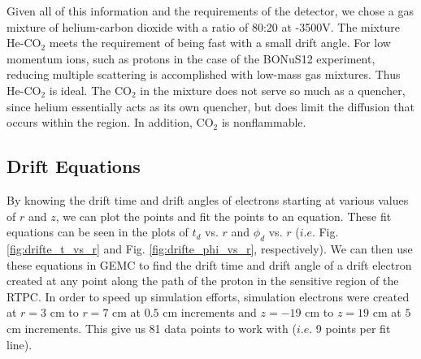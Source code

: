 Given all of this information and the requirements of the detector, we chose a gas mixture of helium-carbon dioxide with a ratio of 80:20 at -3500V. The mixture He-CO$_2$ meets the requirement of being fast with a small drift angle. For low momentum ions, such as protons in the case of the BONuS12 experiment, reducing multiple scattering is accomplished with low-mass gas mixtures. Thus He-CO$_2$ is ideal. The CO$_2$ in the mixture does not serve so much as a quencher, since helium essentially acts as its own quencher, but does limit the diffusion that occurs within the region. In addition, CO$_2$ is nonflammable.

\subsection{Drift Equations}
By knowing the drift time and drift angles of electrons starting at various values of $r$ and $z$, we can plot the points and fit the points to an equation. These fit equations can be seen in the plots of $t_d$ vs. $r$ and $\phi_d$ vs. $r$ ($i.e.$ Fig. \ref{fig:drifte_t_vs_r} and Fig. \ref{fig:drifte_phi_vs_r}, respectively). We can then use these equations in GEMC to find the drift time and drift angle of a drift electron created at any point along the path of the proton in the sensitive region of the RTPC. In order to speed up simulation efforts, simulation electrons were created at $r = 3$ cm to $r = 7$ cm at $0.5$ cm increments and $z = -19$ cm to $z = 19$ cm at $5$ cm increments. This give us 81 data points to work with ($i.e.$ 9 points per fit line).

